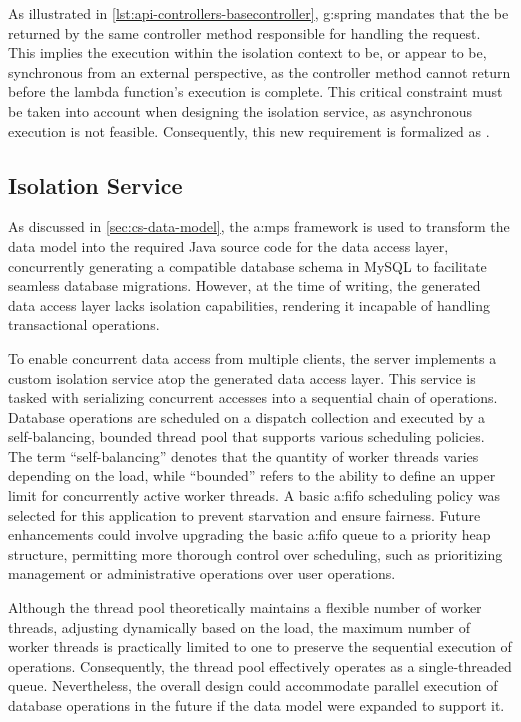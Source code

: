 As illustrated in \cref{lst:api-controllers-basecontroller}, \gls{g:spring} mandates that the  be returned by the same controller method responsible for handling the request. This implies the execution within the isolation context to be, or appear to be, synchronous from an external perspective, as the controller method cannot return before the lambda function's execution is complete. This critical constraint must be taken into account when designing the isolation service, as asynchronous execution is not feasible. Consequently, this new requirement is formalized as \requirementdef\label{req:synchronous-isolation}.

\subsection{Isolation Service}\label{sec:cs-isolation}

As discussed in \cref{sec:cs-data-model}, the \gls{a:mps} framework is used to transform the data model into the required Java source code for the data access layer, concurrently generating a compatible database schema in MySQL to facilitate seamless database migrations. However, at the time of writing, the generated data access layer lacks isolation capabilities, rendering it incapable of handling transactional operations.

To enable concurrent data access from multiple clients, the server implements a custom isolation service atop the generated data access layer. This service is tasked with serializing concurrent accesses into a sequential chain of operations. Database operations are scheduled on a dispatch collection and executed by a self-balancing, bounded thread pool that supports various scheduling policies. The term \enquote{self-balancing} denotes that the quantity of worker threads varies depending on the load, while \enquote{bounded} refers to the ability to define an upper limit for concurrently active worker threads. A basic \gls{a:fifo} scheduling policy was selected for this application to prevent starvation and ensure fairness. Future enhancements could involve upgrading the basic \gls{a:fifo} queue to a priority heap structure, permitting more thorough control over scheduling, such as prioritizing management or administrative operations over user operations.

Although the thread pool theoretically maintains a flexible number of worker threads, adjusting dynamically based on the load, the maximum number of worker threads is practically limited to one to preserve the sequential execution of operations. Consequently, the thread pool effectively operates as a single-threaded queue. Nevertheless, the overall design could accommodate parallel execution of database operations in the future if the data model were expanded to support it.

